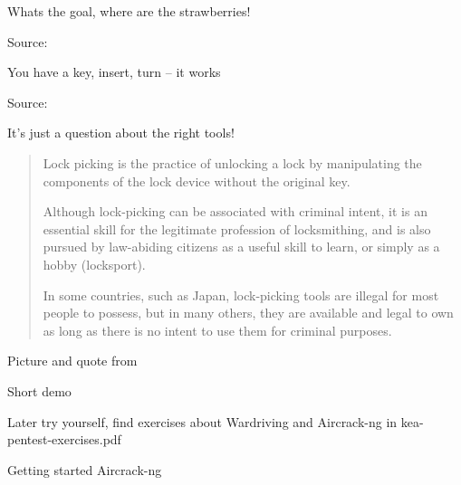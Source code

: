 \documentclass[Screen16to9,17pt]{foils}
\begin{document}
\centerline{Whats the goal, where are the strawberries!}



Source:

\begin{list2}
\item You have a key, insert, turn -- it works
\end{list2}


Source:

\begin{list2}
\item It's just a question about the right tools!
\end{list2}



\begin{quote}\footnotesize
Lock picking is the practice of unlocking a lock by manipulating the components of the lock device without the original key.

Although lock-picking can be associated with criminal intent, it is an essential skill for the legitimate profession of locksmithing, and is also pursued by law-abiding citizens as a useful skill to learn, or simply as a hobby (locksport).

In some countries, such as Japan, lock-picking tools are illegal for most people to possess, but in many others, they are available and legal to own as long as there is no intent to use them for criminal purposes.
\end{quote}
Picture  and quote from 





\begin{list2}
\item Short demo
\item Later try yourself, find exercises about Wardriving and Aircrack-ng in kea-pentest-exercises.pdf
\item Getting started Aircrack-ng 
\end{list2}
\end{document}
